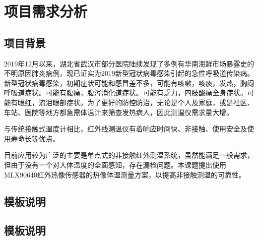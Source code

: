\chapter{项目需求分析}
\section{项目背景}
2019年12月以来，湖北省武汉市部分医院陆续发现了多例有华南海鲜市场暴露史的不明原因肺炎病例，现已证实为2019新型冠状病毒感染引起的急性呼吸道传染病。新型冠状病毒感染，初期症状可能和感冒差不多，可能有咳嗽，咳痰，发热，胸闷呼吸道症状。可能有腹痛，腹泻消化道症状。可能有乏力，四肢酸痛全身症状。可能有眼红，流泪眼部症状。为了更好的防控防治，无论是个人及家庭，或是社区、车站、医院等地方都急需体温计来筛查发热病人，因此测温仪需求量大增。

与传统接触式温度计相比，红外线测温仪有着响应时间快、非接触、使用安全及使用寿命长等优点。

目前应用较为广泛的主要是单点式的非接触红外测温系统，虽然能满足一般需求，但由于没有一个对人体温度的全面感知，存在漏检问题。本课题提出使用MLX90640红外热像传感器的热像体温测量方案，以提高非接触测温的可靠性。
\section{}
\section{模板说明}
\section{模板说明}
